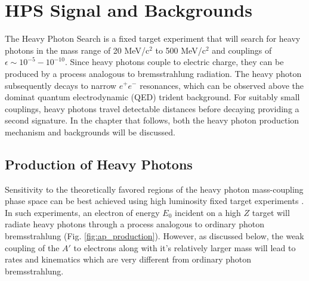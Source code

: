 
\chapter{HPS Signal and Backgrounds}

The Heavy Photon Search is a fixed target experiment that will search for heavy
photons in the mass range of 20 MeV/c$^{2}$ to 500 MeV/c$^{2}$ and couplings
of $\epsilon \sim 10^{-5} - 10^{-10}$.  Since heavy photons couple to electric
charge, they can be produced by a process analogous to bremsstrahlung 
radiation.  The heavy photon subsequently decays to narrow $e^+e^-$ resonances, 
which can be observed above the dominat quantum electrodynamic (QED) trident
background.  For suitably small couplings, heavy photons travel detectable 
distances before decaying providing a second signature.  In the chapter that
follows, both the heavy photon production mechanism and backgrounds will be 
discussed.

\section{Production of Heavy Photons}

Sensitivity to the theoretically favored regions of the heavy photon 
mass-coupling phase space can be best achieved using high luminosity fixed
target experiments \cite{PhysRevD.80.075018}.  In such experiments, an electron
of energy $E_{0}$ incident on a high $Z$ target will radiate heavy photons 
through a process analogous to ordinary photon bremsstrahlung 
%
%
(Fig. \ref{fig:ap_production}).  However, as discussed below, the weak coupling
of the $A'$ to electrons along with it's relatively larger mass will lead to 
rates and kinematics which are very different from ordinary photon 
bremsstrahlung.

